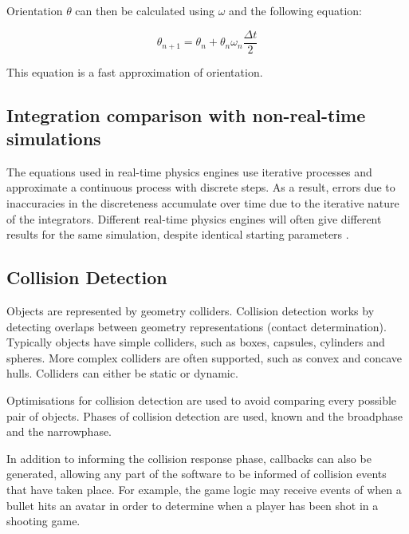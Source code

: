 Orientation $\theta$ can then be calculated using $\omega$ and the following equation:

\begin{equation}
\theta_{n+1}=\theta_n+\theta_n\omega_n\frac{\Delta t}{2}
\end{equation}

This equation is a fast approximation of orientation.

\subsection{Integration comparison with non-real-time simulations}
The equations used in real-time physics engines use iterative processes and approximate a continuous process with discrete steps. As a result, errors due to inaccuracies in the discreteness accumulate over time due to the iterative nature of the integrators. Different real-time physics engines will often give different results for the same simulation, despite identical starting parameters \cite{Boeing2007}.

\subsection{Collision Detection}\label{collision_detection}
Objects are represented by geometry colliders. Collision detection works by detecting overlaps between geometry representations  (contact determination).
Typically objects have simple colliders, such as boxes, capsules, cylinders and spheres. More complex colliders are often supported, such as convex and concave hulls. Colliders can either be static or dynamic.

Optimisations for collision detection are used to avoid comparing every possible pair of objects. Phases of collision detection are used, known and the broadphase and the narrowphase.

In addition to informing the collision response phase, callbacks can also be generated, allowing any part of the software to be informed of collision events that have taken place. For example, the game logic may receive events of when a bullet hits an avatar in order to determine when a player has been shot in a shooting game.




